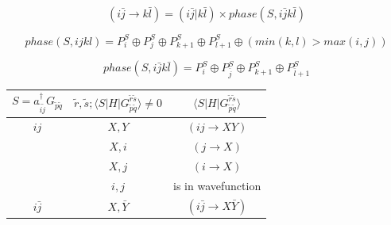 \documentclass[./thesis.tex]{subfiles}
\begin{document}
\begin{equation}
(i\bar j \rightarrow k\bar l) = (i\bar j|k\bar l) \times phase(S,i\bar jk\bar l)
\end{equation}




\begin{equation}
phase(S,ijkl) = P^S_i \oplus P^S_j \oplus P^S_{k+1} \oplus P^S_{l+1} \oplus (min(k,l)>max(i,j))
\end{equation}


\begin{equation}
phase(S,i\bar jk\bar l) = P^S_i \oplus P^S_{\bar j} \oplus P^S_{k+1} \oplus P^S_{\bar l+1}
\end{equation}




\begin{table} 
	\begin{tabular}{ c|c|c }
		\hline \hline
		$S = a^\dagger_{\tilde i \tilde j} G_{\tilde p \tilde q} $                   & $\tilde r, \tilde s ; \langle S|H|G_{\tilde p \tilde q}^{\tilde r \tilde s} \rangle \neq 0$  & $\langle S|H|G_{\tilde p \tilde q}^{\tilde r \tilde s} \rangle$ \\
		\hline \hline
		\rule{0pt}{3ex}  $ij$                                                                                               & $X,Y$                                                                                        & $(ij \rightarrow XY)$                                           \\
		                                                                                                                                                                                                 & $X,i$                                                                                        & $(j \rightarrow X)$                                             \\
		                                                                                                   & $X,j$                                                                                        & $(i \rightarrow X)$                                             \\
		                                                                                                   & $i,j$                                                                                        & is in wavefunction                                              \\
		\hline
		\rule{0pt}{3ex} $i\bar{j}$                                                                                         & $X,\bar Y$                                                                                   & $(i \bar j\rightarrow X \bar Y)$                                \\ 

\end{tabular}
\end{table}
\end{document}
